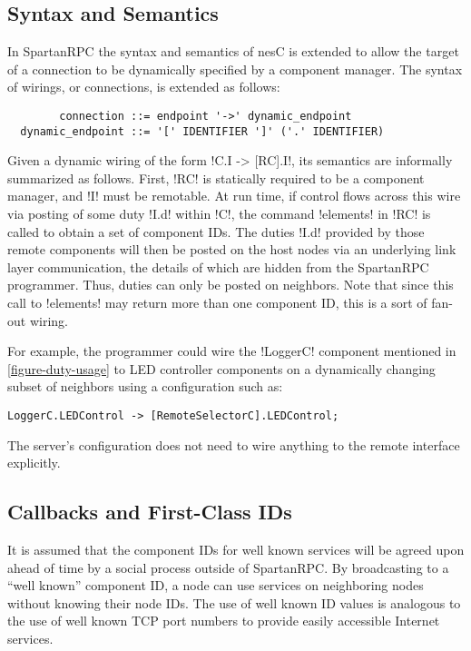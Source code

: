 \subsection{Syntax and Semantics}
\label{section-wiringsyntax}

In SpartanRPC the syntax and semantics of nesC is extended to allow the target of a connection
to be dynamically specified by a component manager. The syntax of wirings, or connections, is
extended as follows:

\singlespace
\begin{Verbatim}
        connection ::= endpoint '->' dynamic_endpoint
  dynamic_endpoint ::= '[' IDENTIFIER ']' ('.' IDENTIFIER)
\end{Verbatim}
\primaryspacing

Given a dynamic wiring of the form !C.I -> [RC].I!, its semantics are informally summarized as
follows. First, !RC! is statically required to be a component manager, and !I! must be
remotable. At run time, if control flows across this wire via posting of some duty !I.d! within
!C!, the command !elements! in !RC! is called to obtain a set of component IDs. The duties !I.d!
provided by those remote components will then be posted on the host nodes via an underlying link
layer communication, the details of which are hidden from the SpartanRPC programmer. Thus,
duties can only be posted on neighbors. Note that since this call to !elements! may return more
than one component ID, this is a sort of fan-out wiring.

For example, the programmer could wire the !LoggerC! component mentioned in
\autoref{figure-duty-usage} to LED controller components on a dynamically changing subset of
neighbors using a configuration such as:
\begin{lstlisting}
LoggerC.LEDControl -> [RemoteSelectorC].LEDControl;
\end{lstlisting}

The server's configuration does not need to wire anything to the remote interface explicitly.

\subsection{Callbacks and First-Class IDs}

It is assumed that the component IDs for well known services will be agreed upon ahead of time by a
social process outside of SpartanRPC. By broadcasting to a ``well known'' component ID, a node
can use services on neighboring nodes without knowing their node IDs. The use of well known ID
values is analogous to the use of well known TCP port numbers to provide easily accessible
Internet services.

